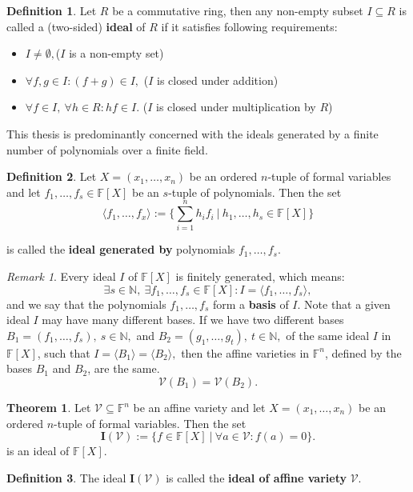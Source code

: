 \documentclass[thesis=M,english]{FITthesis}[2012/10/20]
\theoremstyle{remark}
\newtheorem*{RM}{Remark}
\theoremstyle{definition}
\newtheorem{DF}{Definition}[section]
\newtheorem{theorem}{Theorem}[section]
\begin{document}
 \begin{DF}
Let $R$ be a commutative ring, then any non-empty subset $I \subseteq R$ is called a (two-sided) \textbf{ideal} of $R$ if it satisfies following requirements:
\begin{itemize}
\item $I \neq \emptyset,$\hfill ($I$ is a non-empty set)
\item $\forall f,g \in I: (f + g) \in I,$ \hfill ($I$ is closed under addition)
\item $\forall f \in I,\ \forall h \in R: hf \in I.$ \hfill ($I$ is closed under multiplication by $R$)
\end{itemize}
\end{DF}
\noindent This thesis is predominantly concerned with the ideals generated by a finite number of polynomials over a finite field.
\begin{DF}
Let $X = (x_1, \ldots ,x_n)$ be an ordered $n$-tuple of formal variables and let $f_1,\ldots,f_s \in \mathbb{F}[X] $ be an $s$-tuple of polynomials. Then the set
$$
\langle f_1, \ldots, f_x \rangle := \bigg\{ \sum_{i=1}^n h_if_i\ |\ h_1,\ldots,h_s \in \mathbb{F}[X]\bigg\}
$$
\end{DF}
\noindent is called the \textbf{ideal generated by} polynomials $f_1,\ldots,f_s$.
\begin{RM}
Every ideal $I$ of $\mathbb{F}[X]$ is finitely generated, which means:
$$
\exists s \in \mathbb{N},\ \exists f_1,\ldots,f_s \in \mathbb{F}[X]: I = \langle f_1, \ldots, f_s \rangle,
$$
\noindent and we say that the polynomials $f_1,\ldots,f_s$ form a \textbf{basis} of $I$. Note that a given ideal $I$ may have many different bases. If we have two different bases $B_1 = (f_1,\ldots,f_s),\ s \in \mathbb{N},$ and $B_2 = (g_1, \ldots, g_t),\ t \in \mathbb{N},$ of the same ideal $I$ in $\mathbb{F}[X]$, such that $I = \langle B_1\rangle = \langle B_2 \rangle,$ then the affine varieties ${\text{in }\mathbb{F}^n}$, defined by the bases $B_1$ and $B_2$, are the same.
$$
\mathcal{V}(B_1) = \mathcal{V}(B_2).
$$
\end{RM}
\begin{theorem}
Let $\mathcal{V} \subseteq \mathbb{F}^n$ be an affine variety and let $X = (x_1, \ldots ,x_n)$ be an ordered $n$-tuple of formal variables. Then the set 
$$
\mathbf{I}(\mathcal{V}) := \{ f \in \mathbb{F}[X]\ |\ \forall a \in \mathcal{V}: f(a) = 0\}.
$$
is an ideal of $\mathbb{F}[X]$.
\end{theorem}
\begin{DF}
The ideal $\mathbf{I}(\mathcal{V})$ is called the \textbf{ideal of affine variety} $\mathcal{V}$.
\end{DF}
\end{document}
